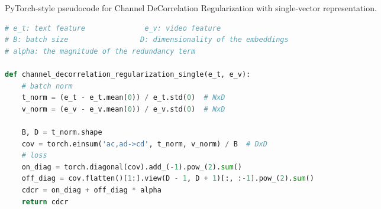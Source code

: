 \documentclass[runningheads]{llncs}
\begin{document}
\begin{algorithm}[tb]
\caption{PyTorch-style pseudocode for Channel DeCorrelation Regularization with single-vector representation.}
\label{alg:cdcr}
   
\begin{lstlisting}[language=python]
# e_t: text feature              e_v: video feature
# B: batch size                 D: dimensionality of the embeddings
# alpha: the magnitude of the redundancy term

def channel_decorrelation_regularization_single(e_t, e_v):    
    # batch norm
    t_norm = (e_t - e_t.mean(0)) / e_t.std(0)  # NxD
    v_norm = (e_v - e_v.mean(0)) / e_v.std(0)  # NxD
    
    B, D = t_norm.shape
    cov = torch.einsum('ac,ad->cd', t_norm, v_norm) / B  # DxD
    # loss
    on_diag = torch.diagonal(cov).add_(-1).pow_(2).sum()
    off_diag = cov.flatten()[1:].view(D - 1, D + 1)[:, :-1].pow_(2).sum()
    cdcr = on_diag + off_diag * alpha
    return cdcr
\end{lstlisting}
\end{algorithm}
\end{document}
